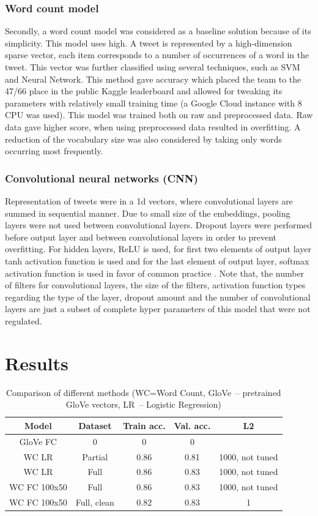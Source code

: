 \documentclass[10pt,conference,compsocconf]{IEEEtran}
\begin{document}
\subsubsection{Word count model}
Secondly, a word count model was considered as a baseline solution because of its simplicity. This model uses high. A tweet is represented by a high-dimension sparse vector, each item corresponds to a number of occurrences of a word in the tweet.
This vector was further classified using several techniques, such as SVM and Neural Network.
This method gave accuracy which placed the team to the 47/66 place in the public Kaggle leaderboard and allowed for tweaking its parameters with relatively small training time (a Google Cloud instance with 8 CPU was used).
This model was trained both on raw and preprocessed data. Raw data gave higher score, when using preprocessed data resulted in overfitting. A reduction of the vocabulary size was also considered by taking only words occurring most frequently.
\subsubsection{Convolutional neural networks (CNN)}

Representation of tweets were in a 1d vectors, where convolutional layers are summed in sequential manner. Due to small size of the embeddings, pooling layers were not used between convolutional layers. Dropout layers were performed before output layer and between convolutional layers \cite{cnn5} in order to prevent overfitting. For hidden layers, ReLU is used, for first two elements of output layer tanh activation function is used and for the last element of output layer, softmax activation function is used in favor of common practice \cite{cnn6}.
Note that, the number of filters for convolutional layers, the size of the filters, activation function types regarding the type of the layer, dropout amount and the number of convolutional layers are just a subset of complete hyper parameters of this model that were not regulated.

\section{Results}
\begin{table}[ht]
	\centering
	\tiny
	\begin{tabular}{|c | c |  c | c | c |} 
		\hline
		Model & Dataset & Train acc. & Val. acc. & L2 \\
		\hline
		GloVe FC & 0 & 0 & 0 & \\
		\hline
		WC LR & Partial & 0.86 & 0.81 & 1000, not tuned\\
		\hline
		WC LR & Full & 0.86 & 0.83 & 1000, not tuned\\
		\hline
		WC FC 100x50 & Full & 0.86 & 0.83 & 1000, not tuned\\
		\hline
		WC FC 100x50 & Full, clean & 0.82 & 0.83 & 1\\ [1ex] 
		\hline
	\end{tabular}
	\caption{Comparison of different methods (WC=Word Count, GloVe~-- pretrained GloVe vectors, LR~-- Logistic Regression)}
	\label{tab:results}
\end{table}
\end{document}
